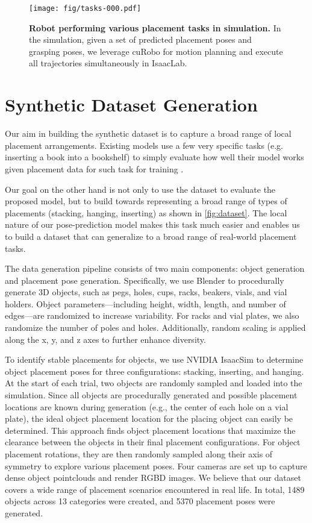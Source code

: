 \begin{figure*}[!ht]
    \centering
    \texttt{[image: fig/tasks-000.pdf]}
    \caption{\textbf{Robot performing various placement tasks in simulation.} In the simulation, given a set of predicted placement poses and grasping poses, we leverage cuRobo for motion planning and execute all trajectories simultaneously in IsaacLab.
    }
    \label{fig:example_placements}
\end{figure*}
\section{Synthetic Dataset Generation}
\label{subsec:synthetic_dataset_generation}
Our aim in building the synthetic dataset is to capture a broad range of local placement arrangements.
Existing models use a few very specific tasks (e.g. inserting a book into a bookshelf) to simply evaluate how well their model works given placement data for such task for training \cite{yuan2023m2t2, 10160736, you2021omnihang}.

Our goal on the other hand is not only to use the dataset to evaluate the proposed model, but to build towards representing a broad range of types of placements (stacking, hanging, inserting) as shown in \autoref{fig:dataset}.
The local nature of our pose-prediction model makes this task much easier and enables us to build a dataset that can generalize to a broad range of real-world placement tasks.

The data generation pipeline consists of two main components: object generation and placement pose generation. Specifically, we use Blender to procedurally generate 3D objects, such as pegs, holes, cups, racks, beakers, vials, and vial holders. Object parameters—including height, width, length, and number of edges—are randomized to increase variability. For racks and vial plates, we also randomize the number of poles and holes. Additionally, random scaling is applied along the x, y, and z axes to further enhance diversity. 

To identify stable placements for objects, we use NVIDIA IsaacSim
to determine object placement poses for three configurations: stacking, inserting, and hanging. At the start of each trial, two objects are randomly sampled and loaded into the simulation. Since all objects are procedurally generated and possible placement locations are known during generation (e.g., the center of each hole on a vial plate), the ideal object placement location for the placing object can easily be determined.
This approach finds object placement locations that maximize the clearance between the objects in their final placement configurations. For object placement rotations, they are then randomly sampled along their axis of symmetry to explore various placement poses.  Four cameras are set up to capture dense object pointclouds and render RGBD images. We believe that our dataset covers a wide range of placement scenarios encountered in real life. In total, \SI{1489}{} objects across \SI{13}{} categories were created, and \SI{5370}{} placement poses were generated.




